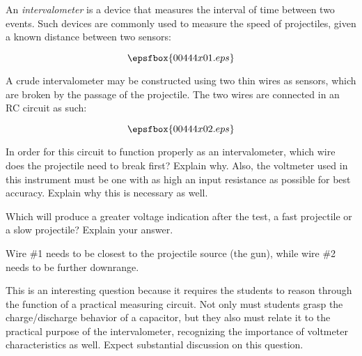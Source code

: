 

An {\it intervalometer} is a device that measures the interval of time between two events.  Such devices are commonly used to measure the speed of projectiles, given a known distance between two sensors:

$$\epsfbox{00444x01.eps}$$

A crude intervalometer may be constructed using two thin wires as sensors, which are broken by the passage of the projectile.  The two wires are connected in an RC circuit as such:

$$\epsfbox{00444x02.eps}$$

In order for this circuit to function properly as an intervalometer, which wire does the projectile need to break first?  Explain why.  Also, the voltmeter used in this instrument must be one with as high an input resistance as possible for best accuracy.  Explain why this is necessary as well.

Which will produce a greater voltage indication after the test, a fast projectile or a slow projectile?  Explain your answer.







Wire \#1 needs to be closest to the projectile source (the gun), while wire \#2 needs to be further downrange.







This is an interesting question because it requires the students to reason through the function of a practical measuring circuit.  Not only must students grasp the charge/discharge behavior of a capacitor, but they also must relate it to the practical purpose of the intervalometer, recognizing the importance of voltmeter characteristics as well.  Expect substantial discussion on this question.





